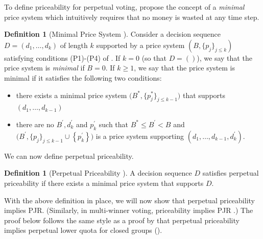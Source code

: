 \documentclass[10pt]{scrartcl}
\theoremstyle{plain}
\theoremstyle{definition}
\newtheorem{definition}[theorem]{Definition}
\renewcommand*{\le}{\leqslant}
\renewcommand*{\leq}{\leqslant}
\renewcommand*{\ge}{\geqslant}
\begin{document}
To define priceability for perpetual voting, \citet{lacknermaly2023} propose the concept of a \emph{minimal} price system which intuitively requires that no money is wasted at any time step.

\begin{definition} [Minimal Price System \citep{lacknermaly2023}]
Consider a decision sequence $D = (d_1, \ldots, d_k)$ of length $k$ supported by a price system $(B,\{p_j\}_{j \leq k})$ satisfying conditions (P1)-(P4) of .
If $k = 0$ (so that $D = ()$), we say that the price system is \emph{minimal} if $B = 0$.
If $k \ge 1$, we say that the price system is minimal if it satisfies the following two conditions:
\begin{itemize}[leftmargin=30pt]
    \item [(P5)] there exists a minimal price system $\big(B^*,\{p_j^*\}_{j \le k-1}\big)$ that supports $(d_1, \ldots, d_{k-1})$
    \item [(P6)] there are no $B^{\prime}, d_k^{\prime}$ and $p_k^{\prime}$ such that $B^* \leq B^{\prime}<B$ and $\big(B^{\prime},\{p_j\}_{j \leq k-1} \cup\left\{p_k^{\prime}\right\}\big)$ is a price system supporting $(d_1, \ldots, d_{k-1}, d_k^{\prime})$.
\end{itemize}
\end{definition}

We can now define perpetual priceability.
\begin{definition} [Perpetual Priceability \citep{lacknermaly2023}]
A decision sequence $D$ satisfies perpetual priceability if there exists a minimal price system that supports $D$.
\end{definition}

With the above definition in place, we will now show that perpetual priceability implies PJR. (Similarly, in multi-winner voting, priceability implies PJR \citep{PeSk20}.) The proof below follows the same style as a proof by \citet{lacknermaly2023} that perpetual priceability implies perpetual lower quota for closed groups (). 
\end{document}
